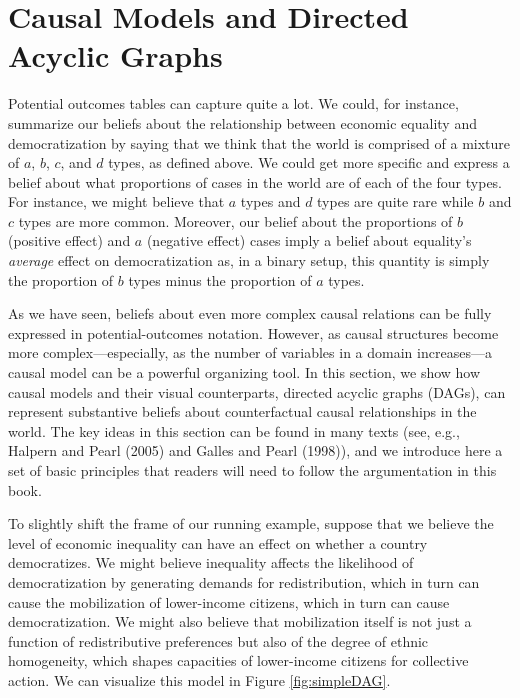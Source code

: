 \documentclass[
  12pt,
]{book}
\begin{document}
\hypertarget{causal-models-and-directed-acyclic-graphs}{%
\section{Causal Models and Directed Acyclic Graphs}\label{causal-models-and-directed-acyclic-graphs}}

Potential outcomes tables can capture quite a lot. We could, for instance, summarize our beliefs about the relationship between economic equality and democratization by saying that we think that the world is comprised of a mixture of \(a\), \(b\), \(c\), and \(d\) types, as defined above. We could get more specific and express a belief about what proportions of cases in the world are of each of the four types. For instance, we might believe that \(a\) types and \(d\) types are quite rare while \(b\) and \(c\) types are more common. Moreover, our belief about the proportions of \(b\) (positive effect) and \(a\) (negative effect) cases imply a belief about equality's \emph{average} effect on democratization as, in a binary setup, this quantity is simply the proportion of \(b\) types minus the proportion of \(a\) types.

As we have seen, beliefs about even more complex causal relations can be fully expressed in potential-outcomes notation. However, as causal structures become more complex---especially, as the number of variables in a domain increases---a causal model can be a powerful organizing tool. In this section, we show how causal models and their visual counterparts, directed acyclic graphs (DAGs), can represent substantive beliefs about counterfactual causal relationships in the world. The key ideas in this section can be found in many texts (see, e.g., Halpern and Pearl (2005) and Galles and Pearl (1998)), and we introduce here a set of basic principles that readers will need to follow the argumentation in this book.

To slightly shift the frame of our running example, suppose that we believe the level of economic inequality can have an effect on whether a country democratizes. We might believe inequality affects the likelihood of democratization by generating demands for redistribution, which in turn can cause the mobilization of lower-income citizens, which in turn can cause democratization. We might also believe that mobilization itself is not just a function of redistributive preferences but also of the degree of ethnic homogeneity, which shapes capacities of lower-income citizens for collective action. We can visualize this model in Figure \ref{fig:simpleDAG}.
\end{document}
